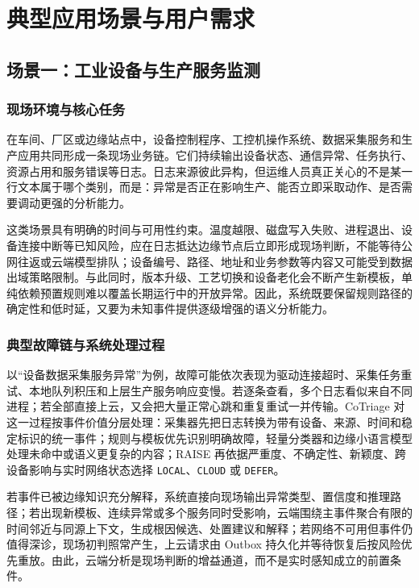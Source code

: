 \chapter{典型应用场景与用户需求}

\section{场景一：工业设备与生产服务监测}

\subsection{现场环境与核心任务}

在车间、厂区或边缘站点中，设备控制程序、工控机操作系统、数据采集服务和生产应用共同形成一条现场业务链。它们持续输出设备状态、通信异常、任务执行、资源占用和服务错误等日志。日志来源彼此异构，但运维人员真正关心的不是某一行文本属于哪个类别，而是：异常是否正在影响生产、能否立即采取动作、是否需要调动更强的分析能力。

这类场景具有明确的时间与可用性约束。温度越限、磁盘写入失败、进程退出、设备连接中断等已知风险，应在日志抵达边缘节点后立即形成现场判断，不能等待公网往返或云端模型排队；设备编号、路径、地址和业务参数等内容又可能受到数据出域策略限制。与此同时，版本升级、工艺切换和设备老化会不断产生新模板，单纯依赖预置规则难以覆盖长期运行中的开放异常。因此，系统既要保留规则路径的确定性和低时延，又要为未知事件提供逐级增强的语义分析能力。

\subsection{典型故障链与系统处理过程}

以“设备数据采集服务异常”为例，故障可能依次表现为驱动连接超时、采集任务重试、本地队列积压和上层生产服务响应变慢。若逐条查看，多个日志看似来自不同进程；若全部直接上云，又会把大量正常心跳和重复重试一并传输。CoTriage 对这一过程按事件价值分层处理：采集器先把日志转换为带有设备、来源、时间和稳定标识的统一事件；规则与模板优先识别明确故障，轻量分类器和边缘小语言模型处理未命中或语义更复杂的内容；RAISE 再依据严重度、不确定性、新颖度、跨设备影响与实时网络状态选择 \texttt{LOCAL}、\texttt{CLOUD} 或 \texttt{DEFER}。

若事件已被边缘知识充分解释，系统直接向现场输出异常类型、置信度和推理路径；若出现新模板、连续异常或多个服务同时受影响，云端围绕主事件聚合有限的时间邻近与同源上下文，生成根因候选、处置建议和解释；若网络不可用但事件仍值得深诊，现场初判照常产生，上云请求由 Outbox 持久化并等待恢复后按风险优先重放。由此，云端分析是现场判断的增益通道，而不是实时感知成立的前置条件。

